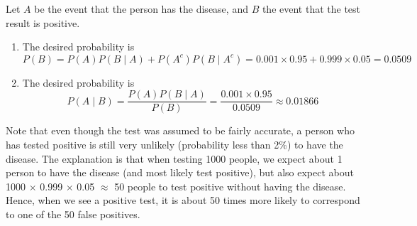 \documentclass{tufte-handout}
\begin{document}
\begin{turn}{0} 
\color{teal}
\begin{minipage}{\linewidth}
\scriptsize
Let $A$ be the event that the person has the disease, and $B$ the event that the test result is positive.
\begin{enumerate}
\item The desired probability is
$$
P(B) = P(A) P(B \mid A) + P(A^c) P(B \mid A^c) = 0.001 \times 0.95 + 0.999 \times 0.05 = 0.0509
$$
\item The desired probability is
$$
P(A \mid B) = \frac{P(A) P(B \mid A)}{P(B)} = \frac{0.001 \times 0.95}{0.0509} \approx 0.01866
$$
\end{enumerate}

Note that even though the test was assumed to be fairly accurate, a person who has tested positive is still very unlikely (probability less than 2\%) to have the disease. The explanation is that when testing 1000 people, we expect about 1 person to have the disease (and most likely test positive), but also expect about 1000 $\times$  0.999 $\times$ 0.05 $\approx$ 50 people to test positive without having the disease. Hence, when we see a positive test, it is about 50 times more likely to correspond to one of the 50 false positives.
\end{minipage}
\end{turn}
\end{document}
